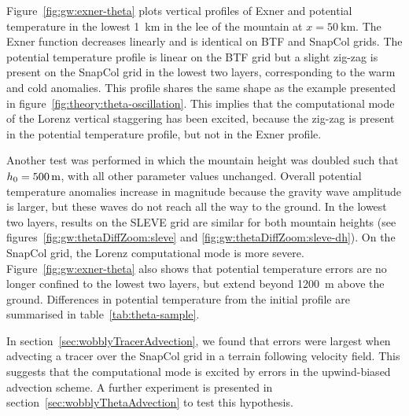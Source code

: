 Figure~\ref{fig:gw:exner-theta} plots vertical profiles of Exner and potential temperature in the lowest \SI{1}{\kilo\meter} in the lee of the mountain at $x = \SI{50}{\kilo\meter}$.  The Exner function decreases linearly and is identical on BTF and SnapCol grids.  The potential temperature profile is linear on the BTF grid but a slight zig-zag is present on the SnapCol grid in the lowest two layers, corresponding to the warm and cold anomalies.  This profile shares the same shape as the example presented in figure~\ref{fig:theory:theta-oscillation}.
This implies that the computational mode of the Lorenz vertical staggering has been excited, because the zig-zag is present in the potential temperature profile, but not in the Exner profile.

Another test was performed in which the mountain height was doubled such that $h_0 = \SI{500}{\meter}$, with all other parameter values unchanged.  Overall potential temperature anomalies increase in magnitude because the gravity wave amplitude is larger, but these waves do not reach all the way to the ground.  In the lowest two layers, results on the SLEVE grid are similar for both mountain heights (see figures~\ref{fig:gw:thetaDiffZoom:sleve} and \ref{fig:gw:thetaDiffZoom:sleve-dh}).  On the SnapCol grid, the Lorenz computational mode is more severe.  Figure~\ref{fig:gw:exner-theta} also shows that potential temperature errors are no longer confined to the lowest two layers, but extend beyond \SI{1200}{\meter} above the ground.  Differences in potential temperature from the initial profile are summarised in table~\ref{tab:theta-sample}.

In section~\ref{sec:wobblyTracerAdvection}, we found that errors were largest when advecting a tracer over the SnapCol grid in a terrain following velocity field.  This suggests that the computational mode is excited by errors in the upwind-biased advection scheme.  A further experiment is presented in section~\ref{sec:wobblyThetaAdvection} to test this hypothesis.


